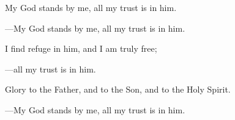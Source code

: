 \responsory
\begin{hangpar}

My God stands by me, all my trust is in him.

{\color{red}---\thinspace}My God stands by me, all my trust is in him.

\medskip I find refuge in him, and I am truly free;

{\color{red}---\thinspace}all my trust is in him.

\medskip Glory to the Father, and to the Son, and to the Holy Spirit.

{\color{red}---\thinspace}My God stands by me, all my trust is in him.
\end{hangpar}
